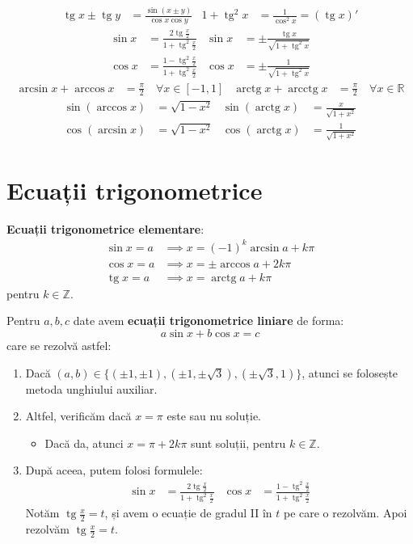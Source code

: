 \documentclass{article}
\DeclareMathOperator{\tg}{tg}
\DeclareMathOperator{\arctg}{arctg}
\DeclareMathOperator{\arcctg}{arcctg}
\begin{document}
\begin{align*}
    \tg x \pm \tg y &= \frac{\sin(x\pm y)}{\cos x \cos y} &
    1 + \tg^2 x &= \frac{1}{\cos^2 x} = (\tg x)'
\end{align*}
\begin{align*}
    \sin x &= \frac{2\tg \frac{x}{2}}{1 + \tg^2 \frac{x}{2}} &
    \sin x &= \pm \frac{\tg x}{\sqrt{1+\tg^2 x}} \\
    \cos x &= \frac{1 - \tg^2 \frac{x}{2}}{1 + \tg^2 \frac{x}{2}} &
    \cos x &= \pm \frac{1}{\sqrt{1+\tg^2 x}}
\end{align*}
\begin{align*}
    \arcsin x + \arccos x &= \frac{\pi}{2}\quad \forall x \in [-1, 1] &
    \arctg x + \arcctg x &= \frac{\pi}{2}\quad \forall x \in \mathbb{R}
\end{align*}
\begin{align*}
    \sin(\arccos x) &= \sqrt{1-x^2} &
    \sin(\arctg x) &= \frac{x}{\sqrt{1+x^2}} \\
    \cos(\arcsin x) &= \sqrt{1-x^2} &
    \cos(\arctg x) &= \frac{1}{\sqrt{1+x^2}}
\end{align*}
\section*{Ecuații trigonometrice}
\begin{minipage}{\textwidth}
\textbf{Ecuații trigonometrice elementare}:
\begin{align*}
\sin x = a &\implies x = (-1)^k \arcsin a + k\pi \\
\cos x = a &\implies x = \pm \arccos a + 2k\pi \\
\tg x = a &\implies x = \arctg a + k\pi
\end{align*}
pentru $k \in \mathbb{Z}$.
\end{minipage}

Pentru $a, b, c$ date avem \textbf{ecuații trigonometrice liniare} de forma:
\begin{equation*}
    a\sin x + b\cos x = c
\end{equation*}
care se rezolvă astfel:
\begin{enumerate}
    \item Dacă $(a, b) \in \{(\pm 1, \pm 1), (\pm 1, \pm \sqrt{3}), (\pm \sqrt{3}, 1)\}$, atunci se folosește metoda unghiului auxiliar.
    \item Altfel, verificăm dacă $x=\pi$ este sau nu soluție.
    \begin{itemize}
        \item Dacă da, atunci $x = \pi + 2k\pi$ sunt soluții, pentru $k \in \mathbb{Z}$.
    \end{itemize}
    \item După aceea, putem folosi formulele:
    \begin{align*}
        \sin x &= \frac{2\tg \frac{x}{2}}{1 + \tg^2 \frac{x}{2}} &
        \cos x &= \frac{1 - \tg^2 \frac{x}{2}}{1 + \tg^2 \frac{x}{2}}
    \end{align*}
    Notăm $\tg \frac{x}{2} = t$, și avem o ecuație de gradul II în $t$ pe care o rezolvăm. Apoi rezolvăm $\tg \frac{x}{2} = t$.
\end{enumerate}
\end{document}
